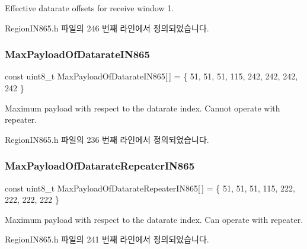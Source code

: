 Effective datarate offsets for receive window 1. 

Region\+I\+N865.\+h 파일의 246 번째 라인에서 정의되었습니다.

\mbox{\label{group___r_e_g_i_o_n_i_n865_ga4729e4e34b8d7776f836a928e12f81b9}} 
\subsubsection{\texorpdfstring{Max\+Payload\+Of\+Datarate\+I\+N865}{MaxPayloadOfDatarateIN865}}
{\footnotesize\ttfamily const uint8\+\_\+t Max\+Payload\+Of\+Datarate\+I\+N865\mbox{[}$\,$\mbox{]} = \{ 51, 51, 51, 115, 242, 242, 242, 242 \}\hspace{0.3cm}{\ttfamily [static]}}

Maximum payload with respect to the datarate index. Cannot operate with repeater. 

Region\+I\+N865.\+h 파일의 236 번째 라인에서 정의되었습니다.

\mbox{\label{group___r_e_g_i_o_n_i_n865_gaee3f7b88b358429d13b4e4dc8f913b47}} 
\subsubsection{\texorpdfstring{Max\+Payload\+Of\+Datarate\+Repeater\+I\+N865}{MaxPayloadOfDatarateRepeaterIN865}}
{\footnotesize\ttfamily const uint8\+\_\+t Max\+Payload\+Of\+Datarate\+Repeater\+I\+N865\mbox{[}$\,$\mbox{]} = \{ 51, 51, 51, 115, 222, 222, 222, 222 \}\hspace{0.3cm}{\ttfamily [static]}}

Maximum payload with respect to the datarate index. Can operate with repeater. 

Region\+I\+N865.\+h 파일의 241 번째 라인에서 정의되었습니다.

